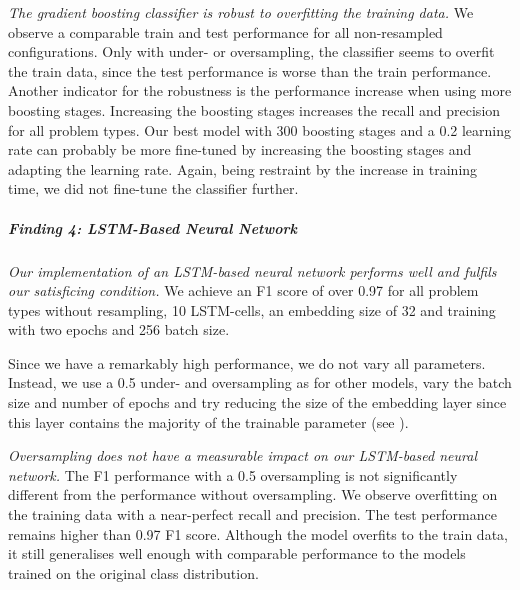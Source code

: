 \textit{The gradient boosting classifier is robust to overfitting the training data.} We observe a comparable train and test performance for all non-resampled configurations. Only with under- or oversampling, the classifier seems to overfit the train data, since the test performance is worse than the train performance. 
Another indicator for the robustness is the performance increase when using more boosting stages. Increasing the boosting stages increases the recall and precision for all problem types. Our best model with 300 boosting stages and a 0.2 learning rate can probably be more fine-tuned by increasing the boosting stages and adapting the learning rate. Again, being restraint by the increase in training time, we did not fine-tune the classifier further.

\begin{center}
\end{center}


\subparagraph{Finding 4: LSTM-Based Neural Network}
\textit{Our implementation of an LSTM-based neural network performs well and fulfils our satisficing condition.} We achieve an F1 score of over 0.97 for all problem types without resampling, 10 LSTM-cells, an embedding size of 32 and training with two epochs and 256 batch size. 


Since we have a remarkably high performance, we do not vary all parameters. Instead, we use a 0.5 under- and oversampling as for other models, vary the batch size and number of epochs and try reducing the size of the embedding layer since this layer contains the majority of the trainable parameter (see ).


\textit{Oversampling does not have a measurable impact on our LSTM-based neural network.} The F1 performance with a 0.5 oversampling is not significantly different from the performance without oversampling. We observe overfitting on the training data with a near-perfect recall and precision. The test performance remains higher than 0.97 F1 score. Although the model overfits to the train data, it still generalises well enough with comparable performance to the models trained on the original class distribution.


